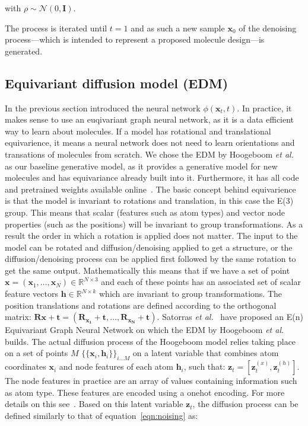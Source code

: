 \documentclass[journal=jacsat,manuscript=article]{achemso}
\begin{document}
with $\rho\sim\mathcal{N}(0,\mathbf{I})$.

The process is iterated until $t=1$ and as such a new sample $\mathbf{x}_0$ of the denoising process---which is intended to represent a proposed molecule design---is generated. 

\subsection*{Equivariant diffusion model (EDM)}
In the previous section introduced the neural network $\phi(\mathbf{x}_t,t)$. In practice, it makes sense to use an euqivariant graph neural network, as it is a data efficient way to learn about molecules. If a model has rotational and translational equivarience, it means a neural network does not need to learn orientations and transations of molecules from scratch. We chose the EDM by Hoogeboom \textit{et al.}~\cite{hoogeboom2022equivariant} as our baseline generative model, as it provides a generative model for new molecules and has equivariance already built into it. Furthermore, it has all code and pretrained weights available online~\cite{githubhoogeboom}. The basic concept behind equivarience is that the model is invariant to rotations and translation, in this case the E(3) group. This means that scalar (features such as atom types) and vector node properties (such as the positions) will be invariant to group transformations. As a result the order in which a rotation is applied does not matter. The input to the model can be rotated and diffusion/denoising  applied to get a structure, or the diffusion/denoising process can be applied first followed by the same rotation to get the same output. 
Mathematically this means that if we have a set of point $\mathbf{x} = (\mathbf{x}_1,\ldots,\mathbf{x}_N) \in \mathbb{R}^{N\times 3}$ and each of these points has an associated set of scalar feature vectors $\mathbf{h}\in \mathbb{R}^{N\times k}$ which are invariant to group transformations. The position translations and rotations are defined according to the orthogonal matrix: $\mathbf{Rx + t} = (\mathbf{R_{x_1}+t},\ldots, \mathbf{R_{x_N}+t})$. Satorras \textit{et al.}~\cite{satorras2022equivariant} have proposed an E(n) Equivariant Graph Neural Network on which the EDM by Hoogeboom \textit{et al.} builds. 
The actual diffusion process of the Hoogeboom model relies taking place on a set of points $M$ $\{\{\mathbf{x}_i,\mathbf{h}_i\}\}_{i\ldots M}$ on a latent variable that combines atom coordinates $\mathbf{x}_i$ and node features of each atom $\mathbf{h}_i$, such that: $\mathbf{z}_t = [\mathbf{z}_t^{(x)}, \mathbf{z}_t^{(h)}]$. The node features in practice are an array of values containing information such as atom type. These features are encoded using a onehot encoding. For more details on this see~\cite{hoogeboom2022equivariant}. Based on this latent variable $\mathbf{z}_t$, the diffusion process can be defined similarly to that of equation~\ref{eqn:noising} as:
\end{document}
